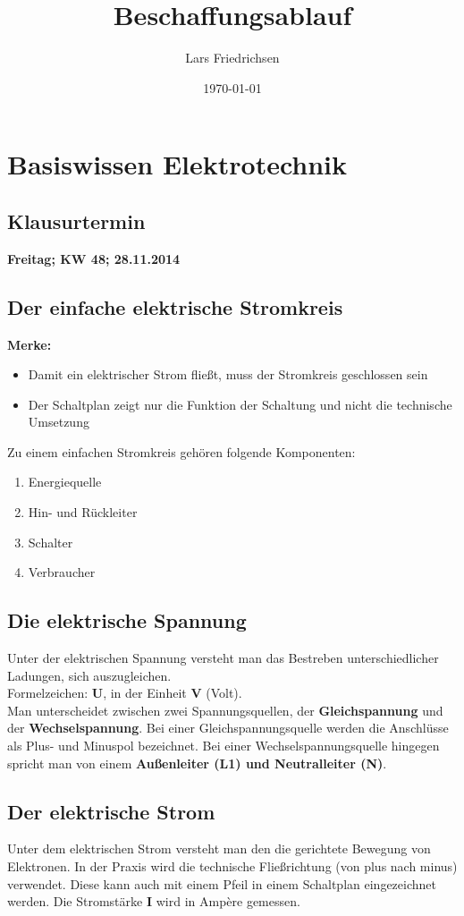 \documentclass[a4paper,11pt]{scrartcl}	%
\title{Beschaffungsablauf}
\author{Lars Friedrichsen}
\date{\today}
\begin{document}
\section{Basiswissen Elektrotechnik}


	\subsection{Klausurtermin}
	
	\textbf{Freitag; KW 48; 28.11.2014}
	
	\subsection{Der einfache elektrische Stromkreis}
	
	\textbf{Merke:}
	
		\begin{itemize}
			\item Damit ein elektrischer Strom fließt, muss der Stromkreis geschlossen sein
			\item Der Schaltplan zeigt nur die Funktion der Schaltung und nicht die technische Umsetzung
		\end{itemize}
	
	Zu einem einfachen Stromkreis gehören folgende Komponenten:
	
		\begin{enumerate}
			\item Energiequelle
			\item Hin- und Rückleiter
			\item Schalter
			\item \glqq Verbraucher\grqq
		\end{enumerate}

	\subsection{Die elektrische Spannung}
	
	Unter der elektrischen Spannung versteht man das Bestreben unterschiedlicher Ladungen, sich auszugleichen. \\[0.5cm]
	Formelzeichen: \textbf{U}, in der Einheit \textbf{V} (Volt). \\[0.5cm]
	Man unterscheidet zwischen zwei Spannungsquellen, der \textbf{Gleichspannung} und der \textbf{Wechselspannung}.
	Bei einer Gleichspannungsquelle werden die Anschlüsse als Plus- und Minuspol bezeichnet. 
	Bei einer Wechselspannungsquelle hingegen spricht man von einem \textbf{Außenleiter (L1) und Neutralleiter (N)}.
	
	\subsection{Der elektrische Strom}
	
	Unter dem elektrischen Strom versteht man den die gerichtete Bewegung von Elektronen. In der Praxis wird die technische
	Fließrichtung (von plus nach minus) verwendet. Diese kann auch mit einem Pfeil in einem Schaltplan eingezeichnet werden.
	Die Stromstärke \textbf{I} wird in Ampère gemessen.	
			
\end{document}
